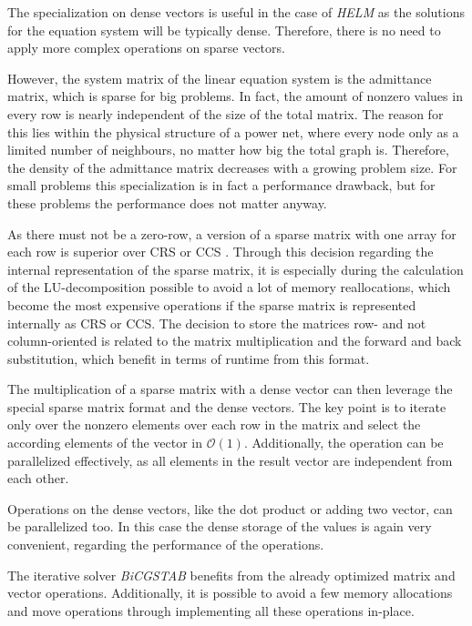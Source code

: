 The specialization on dense vectors is useful in the case of \emph{HELM} as the solutions for the equation system will be typically dense. Therefore, there is no need to apply more complex operations on sparse vectors.

However, the system matrix of the linear equation system is the admittance matrix, which is sparse for big problems. In fact, the amount of nonzero values in every row is nearly independent of the size of the total matrix. The reason for this lies within the physical structure of a power net, where every node only as a limited number of neighbours, no matter how big the total graph is. Therefore, the density of the admittance matrix decreases with a growing problem size. For small problems this specialization is in fact a performance drawback, but for these problems the performance does not matter anyway.

As there must not be a zero-row, a version of a sparse matrix with one array for each row is superior over CRS \cite{sparseMatricesJava} or CCS \cite{sparseMatricesJava}. Through this decision regarding the internal representation of the sparse matrix, it is especially during the calculation of the LU-decomposition possible to avoid a lot of memory reallocations, which become the most expensive operations if the sparse matrix is represented internally as CRS or CCS. The decision to store the matrices row- and not column-oriented is related to the matrix multiplication and the forward and back substitution, which benefit in terms of runtime from this format.

The multiplication of a sparse matrix with a dense vector can then leverage the special sparse matrix format and the dense vectors. The key point is to iterate only over the nonzero elements over each row in the matrix and select the according elements of the vector in $\mathcal O(1)$. Additionally, the operation can be parallelized effectively, as all elements in the result vector are independent from each other.

Operations on the dense vectors, like the dot product or adding two vector, can be parallelized too. In this case the dense storage of the values is again very convenient, regarding the performance of the operations.

The iterative solver \emph{BiCGSTAB} benefits from the already optimized matrix and vector operations. Additionally, it is possible to avoid a few memory allocations and move operations through implementing all these operations in-place.

